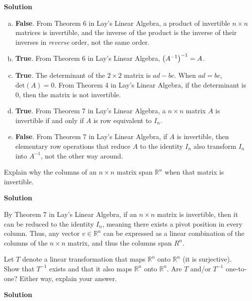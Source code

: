 \documentclass[11pt]{scrartcl}
\theoremstyle{dotlessP}
\theoremstyle{dotlessN}
\DeclarePairedDelimiter\paren{(}{)} %
\newcommand{\reals}{\mathbb{R}} %
\begin{document}
\textbf{Solution}
\begin{enumerate}[(a)]
	\item \textbf{False}. From Theorem 6 in Lay's Linear Algebra, a product of invertible $n \times n$ matrices is invertible, and the inverse of the product is the inverse of their inverses in \textit{reverse} order, not the same order.
	\item \textbf{True}. From Theorem 6 in Lay's Linear Algebra, $\paren*{A^{-1}}^{-1} = A$.
	\item \textbf{True}. The determinant of the $2 \times 2$ matrix is $ad - bc$. When $ad = bc$, $\text{det} (A) = 0$. From Theorem 4 in Lay's Linear Algebra, if the determinant is 0, then the matrix is not invertible.
	\item \textbf{True}. From Theorem 7 in Lay's Linear Algebra, a $n \times n$ matrix $A$ is invertible if and only if $A$ is row equivalent to $I_n$.
	\item \textbf{False}. From Theorem 7 in Lay's Linear Algebra, if $A$ is invertible, then elementary row operations that reduce $A$ to the identity $I_n$ also transform $I_n$ into $A^{-1}$, not the other way around.
\end{enumerate}
\begin{ques}
	Explain why the columns of an $n \times n$ matrix span $\mathbb{R}^n$ when that matrix is invertible.
\end{ques}
\textbf{Solution}

By Theorem 7 in Lay's Linear Algebra, if an $n \times n$ matrix is invertible, then it can be reduced to the identity $I_n$, meaning there exists a pivot position in every column. Thus, any vector $v \in \reals^n$ can be expressed as a linear combination of the columns of the $n \times n$ matrix, and thus the columns span $R^n$.
\begin{ques}
	Let $T$ denote a linear transformation that maps $\mathbb{R}^n$ onto $\mathbb{R}^n$ (it is surjective). Show that $T^{-1}$ exists and that it also maps $\mathbb{R}^n$ onto $\mathbb{R}^n$. Are $T$ and/or $T^{-1}$ one-to-one? Either way, explain your answer.
\end{ques}
\textbf{Solution}
\end{document}
